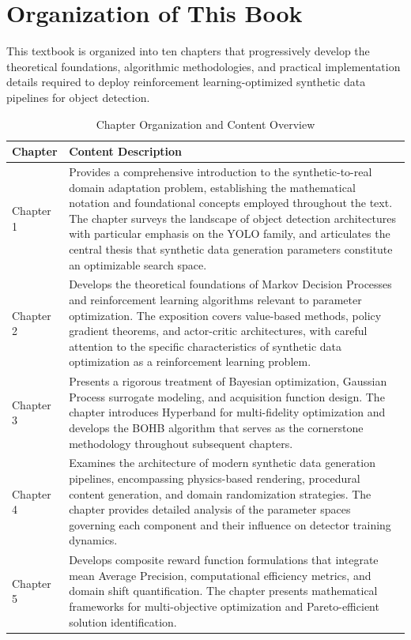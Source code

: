 \section*{Organization of This Book}

This textbook is organized into ten chapters that progressively develop the theoretical foundations, algorithmic methodologies, and practical implementation details required to deploy reinforcement learning-optimized synthetic data pipelines for object detection.

\begin{table}[h]
\centering
\caption{Chapter Organization and Content Overview}
\label{tab:chapter_organization}
\begin{tabular}{p{}p{}}
\toprule
\textbf{Chapter} & \textbf{Content Description} \\
\midrule
Chapter 1 & Provides a comprehensive introduction to the synthetic-to-real domain adaptation problem, establishing the mathematical notation and foundational concepts employed throughout the text. The chapter surveys the landscape of object detection architectures with particular emphasis on the YOLO family, and articulates the central thesis that synthetic data generation parameters constitute an optimizable search space. \\
\addlinespace
Chapter 2 & Develops the theoretical foundations of Markov Decision Processes and reinforcement learning algorithms relevant to parameter optimization. The exposition covers value-based methods, policy gradient theorems, and actor-critic architectures, with careful attention to the specific characteristics of synthetic data optimization as a reinforcement learning problem. \\
\addlinespace
Chapter 3 & Presents a rigorous treatment of Bayesian optimization, Gaussian Process surrogate modeling, and acquisition function design. The chapter introduces Hyperband for multi-fidelity optimization and develops the BOHB algorithm that serves as the cornerstone methodology throughout subsequent chapters. \\
\addlinespace
Chapter 4 & Examines the architecture of modern synthetic data generation pipelines, encompassing physics-based rendering, procedural content generation, and domain randomization strategies. The chapter provides detailed analysis of the parameter spaces governing each component and their influence on detector training dynamics. \\
\addlinespace
Chapter 5 & Develops composite reward function formulations that integrate mean Average Precision, computational efficiency metrics, and domain shift quantification. The chapter presents mathematical frameworks for multi-objective optimization and Pareto-efficient solution identification. \\

\end{tabular}
\end{table}
